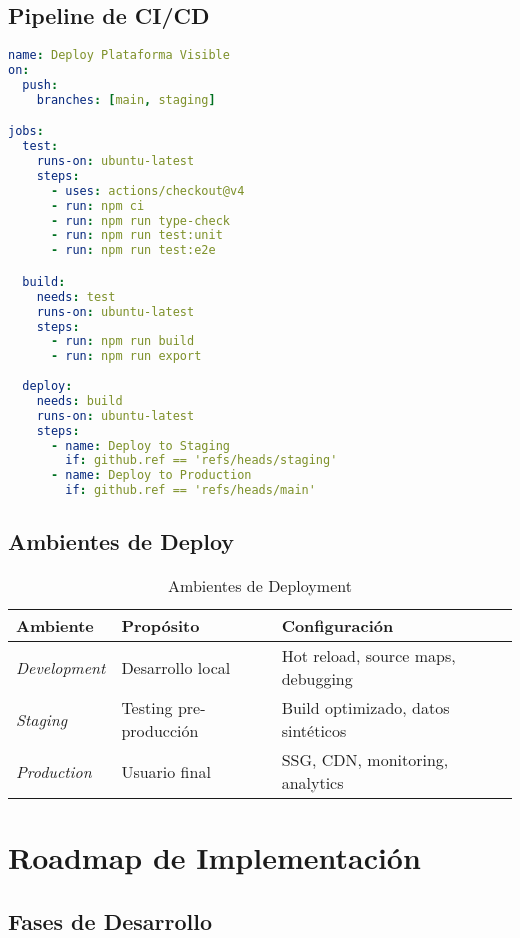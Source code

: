 \documentclass[12pt,a4paper]{article}
\begin{document}
\subsection{Pipeline de CI/CD}

\begin{lstlisting}[language=yaml, caption=GitHub Actions Workflow]
name: Deploy Plataforma Visible
on:
  push:
    branches: [main, staging]

jobs:
  test:
    runs-on: ubuntu-latest
    steps:
      - uses: actions/checkout@v4
      - run: npm ci
      - run: npm run type-check
      - run: npm run test:unit
      - run: npm run test:e2e

  build:
    needs: test
    runs-on: ubuntu-latest
    steps:
      - run: npm run build
      - run: npm run export
      
  deploy:
    needs: build
    runs-on: ubuntu-latest
    steps:
      - name: Deploy to Staging
        if: github.ref == 'refs/heads/staging'
      - name: Deploy to Production
        if: github.ref == 'refs/heads/main'
\end{lstlisting}

\subsection{Ambientes de Deploy}

\begin{table}[h!]
\centering
\begin{tabularx}{\textwidth}{|l|l|X|}
\hline
\textbf{Ambiente} & \textbf{Propósito} & \textbf{Configuración} \\
\hline
\textit{Development} & Desarrollo local & Hot reload, source maps, debugging \\
\hline
\textit{Staging} & Testing pre-producción & Build optimizado, datos sintéticos \\
\hline
\textit{Production} & Usuario final & SSG, CDN, monitoring, analytics \\
\hline
\end{tabularx}
\caption{Ambientes de Deployment}
\end{table}

\section{Roadmap de Implementación}

\subsection{Fases de Desarrollo}
\end{document}
